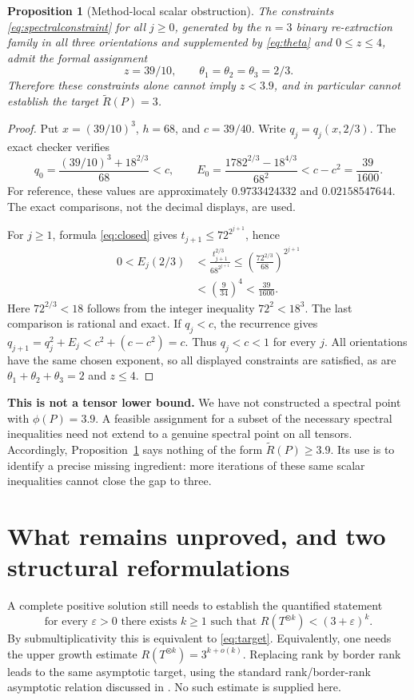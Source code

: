 \documentclass[11pt]{article}
\newcommand{\AR}{\widetilde{R}}
\newtheorem{proposition}[theorem]{Proposition}
\theoremstyle{definition}\newtheorem{definition}[theorem]{Definition}
\theoremstyle{remark}\newtheorem{remark}[theorem]{Remark}
\begin{document}
\begin{proposition}[Method-local scalar obstruction]\label{prop:barrier}
The constraints \eqref{eq:spectralconstraint} for all $j\geq0$, generated by the
$n=3$ binary re-extraction family in all three orientations and supplemented by
\eqref{eq:theta} and $0\leq z\leq4$, admit the formal assignment
\[
z=39/10,\qquad \theta_1=\theta_2=\theta_3=2/3.
\]
Therefore these constraints alone cannot imply $z<3.9$, and in particular
cannot establish the target $\AR(P)=3$.
\end{proposition}
\begin{proof}
Put $x=(39/10)^3$, $h=68$, and $c=39/40$. Write $q_j=q_j(x,2/3)$.
The exact checker verifies
\[
q_0=\frac{(39/10)^3+18^{2/3}}{68}<c,
\qquad
E_0=\frac{1782^{2/3}-18^{4/3}}{68^2}<c-c^2=\frac{39}{1600}.
\]
For reference, these values are approximately $0.9733424332$ and
$0.02158547644$. The exact comparisons, not the decimal displays, are used.

For $j\geq1$, formula \eqref{eq:closed} gives $t_{j+1}\leq72^{2^{j+1}}$, hence
\begin{align*}
0<E_j(2/3)
&<\frac{t_{j+1}^{2/3}}{68^{2^{j+1}}}
\leq\left(\frac{72^{2/3}}{68}\right)^{2^{j+1}}\\
&<\left(\frac9{34}\right)^4<\frac{39}{1600}.
\end{align*}
Here $72^{2/3}<18$ follows from the integer inequality $72^2<18^3$.
The last comparison is rational and exact. If $q_j<c$, the recurrence gives
$q_{j+1}=q_j^2+E_j<c^2+(c-c^2)=c$. Thus $q_j<c<1$ for every $j$.
All orientations have the same chosen exponent, so all displayed constraints
are satisfied, as are $\theta_1+\theta_2+\theta_3=2$ and $z\leq4$.
\end{proof}

\textbf{This is not a tensor lower bound.} We have not constructed a spectral
point with $\phi(P)=3.9$. A feasible assignment for a subset of the necessary
spectral inequalities need not extend to a genuine spectral point on all
tensors. Accordingly, Proposition~\ref{prop:barrier} says nothing of the form
$\AR(P)\geq3.9$. Its use is to identify a precise missing ingredient: more
iterations of these same scalar inequalities cannot close the gap to three.

\section{What remains unproved, and two structural reformulations}
A complete positive solution still needs to establish the quantified statement
\begin{equation}\label{eq:quantifier}
\text{for every }\varepsilon>0\text{ there exists }k\geq1\text{ such that }
R(T^{\otimes k})<(3+\varepsilon)^k.
\end{equation}
By submultiplicativity this is equivalent to \eqref{eq:target}. Equivalently,
one needs the upper growth estimate $R(T^{\otimes k})=3^{k+o(k)}$.
Replacing rank by border rank leads to the same asymptotic target, using the
standard rank/border-rank asymptotic relation discussed in \cite{alman}.
No such estimate is supplied here.
\end{document}
